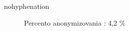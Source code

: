 \begin{hyphenrules}{nohyphenation}
\begin{figure}[H]
\begin{minipage}[t]{.4\linewidth}
\caption{Percento anonymizovania : 4,2 \%}
\label{fig:5.7} 
\end{minipage}\hfill
\begin{minipage}[b]{.4\linewidth}

\end{minipage}
\end{figure}
\end{hyphenrules}
